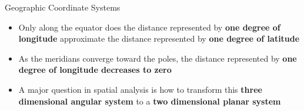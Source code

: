 \documentclass[dvipsnames,hyperref={pdfpagelabels=false}]{beamer}
\begin{document}
\begin{frame}{Geographic Coordinate Systems}
	\begin{itemize}
		\item Only along the equator does the distance represented by \textbf{one degree of longitude} approximate the distance represented by \textbf{one degree of latitude}
		\vspace{0.2cm}
		\item As the meridians converge toward the poles, the distance represented by \textbf{one degree of longitude decreases to zero}
		\vspace{0.2cm}	
		\item A major question in spatial analysis is how to transform this \textbf{three dimensional angular system} to a \textbf{two dimensional planar system}
		
	\end{itemize}
\end{frame}
 
 
 
 
 
\end{document}
